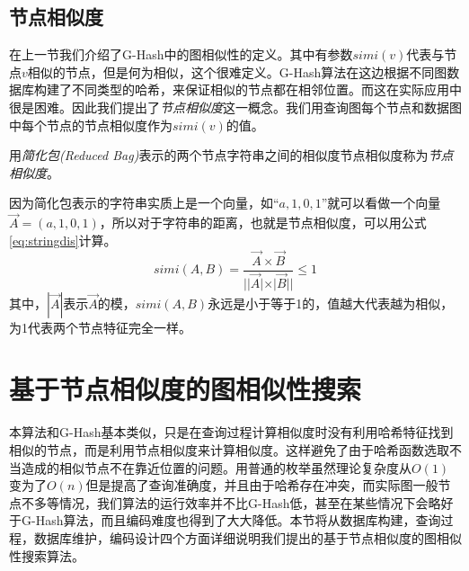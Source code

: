 \documentclass{XDBAthesis}
\begin{document}
\subsection{节点相似度}
在上一节我们介绍了G-Hash中的图相似性的定义。其中有参数$simi(v)$代表与节点$v$相似的节点，但是何为相似，这个很难定义。G-Hash算法在这边根据不同图数据库构建了不同类型的哈希，来保证相似的节点都在相邻位置。而这在实际应用中很是困难。因此我们提出了\emph{节点相似度}这一概念。我们用查询图每个节点和数据图中每个节点的节点相似度作为$simi(v)$的值。
\begin{defn}[节点相似度]
    用\emph{简化包(Reduced Bag)}表示的两个节点字符串之间的相似度节点相似度称为\emph{节点相似度}。
\end{defn}
因为简化包表示的字符串实质上是一个向量，如$“a,1,0,1”$就可以看做一个向量$\vec{A}=(a,1,0,1) $，所以对于字符串的距离，也就是节点相似度，可以用公式\eqref{eq:stringdis}计算。
\begin{equation}
    simi(A,B)=\frac{\vec{A}\times \vec{B}}{||\vec{A}|\times |\vec{B}||} \leq 1
    \label{eq:stringdis}
\end{equation}
其中，$|\vec{A}|$表示$\vec{A}$的模，$simi(A,B)$永远是小于等于1的，值越大代表越为相似，为1代表两个节点特征完全一样。
\section{基于节点相似度的图相似性搜索}
本算法和G-Hash\cite{ghash}基本类似，只是在查询过程计算相似度时没有利用哈希特征找到相似的节点，而是利用节点相似度来计算相似度。这样避免了由于哈希函数选取不当造成的相似节点不在靠近位置的问题。用普通的枚举虽然理论复杂度从$O(1)$变为了$O(n)$但是提高了查询准确度，并且由于哈希存在冲突，而实际图一般节点不多等情况，我们算法的运行效率并不比G-Hash低，甚至在某些情况下会略好于G-Hash算法，而且编码难度也得到了大大降低。本节将从数据库构建，查询过程，数据库维护，编码设计四个方面详细说明我们提出的基于节点相似度的图相似性搜索算法。
\end{document}
